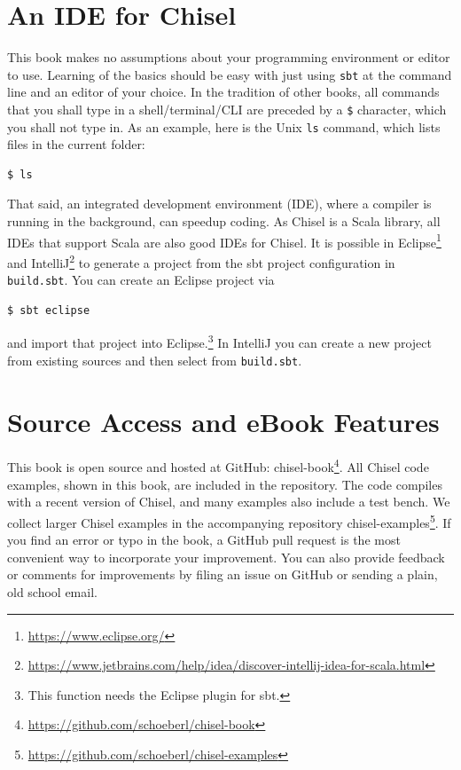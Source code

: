 \documentclass[%
    10pt,
    headinclude, footexclude,
    openright, %
    notitlepage,
    cleardoubleempty,
    headsepline,
    pointlessnumbers,
    bibtotoc, idxtotoc,
    ]{scrbook}
\newcommand{\code}[1]{{\small{\texttt{#1}}}}
\newcommand{\myref}[2]{\href{#1}{#2}}
\renewcommand{\myref}[2]{{#2}{\footnote{\url{#1}}}}
\begin{document}
\section{An IDE for Chisel}

This book makes no assumptions about your programming environment or editor to use.
Learning of the basics should be easy with just using \code{sbt} at the command line
and an editor of your choice. In the tradition of other books, all commands that you
shall type in a shell/terminal/CLI are preceded by a \code{\$} character, which you
shall not type in. As an example, here is the Unix \code{ls} command, which lists files in
the current folder:

\begin{verbatim}
$ ls
\end{verbatim}

That said, an integrated development environment (IDE), where a compiler is running in
the background, can speedup coding. As Chisel is a Scala library, all IDEs
that support Scala are also good IDEs for Chisel.
It is possible in \myref{https://www.eclipse.org/}{Eclipse} and
\myref{https://www.jetbrains.com/help/idea/discover-intellij-idea-for-scala.html}{IntelliJ}
to generate a project from the sbt project configuration in \code{build.sbt}.
You can create an Eclipse project via
\begin{verbatim}
$ sbt eclipse
\end{verbatim}
and import that project into Eclipse.\footnote{This function needs the Eclipse plugin for sbt.}
In IntelliJ you can create a new project from existing sources and then select from \code{build.sbt}.

\section{Source Access and eBook Features}

This book is open source and hosted at GitHub: \myref{https://github.com/schoeberl/chisel-book}{chisel-book}.
All Chisel code examples, shown in this book, are included in the repository.
The code compiles with a recent version of Chisel, and many examples also include a test bench.
We collect larger Chisel examples in the accompanying repository \myref{https://github.com/schoeberl/chisel-examples}{chisel-examples}. If you find an error or typo in the book, a GitHub pull request is the most convenient way to incorporate your improvement.
You can also provide feedback or comments for improvements by filing an issue on GitHub
or sending a plain, old school email.
\end{document}
